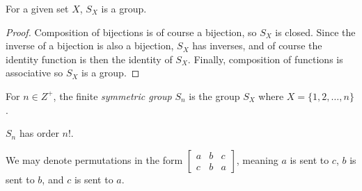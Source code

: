 \documentclass[12pt]{article}
\begin{document}
\begin{prop}
    For a given set $X$, $S_X$ is a group.
\end{prop}

\begin{proof}
    Composition of bijections is of course a bijection, so $S_X$ is closed. Since the inverse of a bijection is also a bijection, $S_X$ has inverses, and of course the identity function is then the identity of $S_X$. Finally, composition of functions is associative so $S_X$ is a group.
\end{proof}

\begin{defn}
    For $n \in Z^+$, the finite \emph{symmetric group} $S_n$ is the group $S_X$ where $X = \{1, 2, \ldots, n\}$.
\end{defn}

\begin{rmk}
    $S_n$ has order $n!$.
\end{rmk}

\begin{rmk}
    We may denote permutations in the form
    $\begin{bmatrix}
        a & b & c \\ c & b & a
    \end{bmatrix}$, meaning $a$ is sent to $c$, $b$ is sent to $b$, and $c$ is sent to $a$.
\end{rmk}
\end{document}
